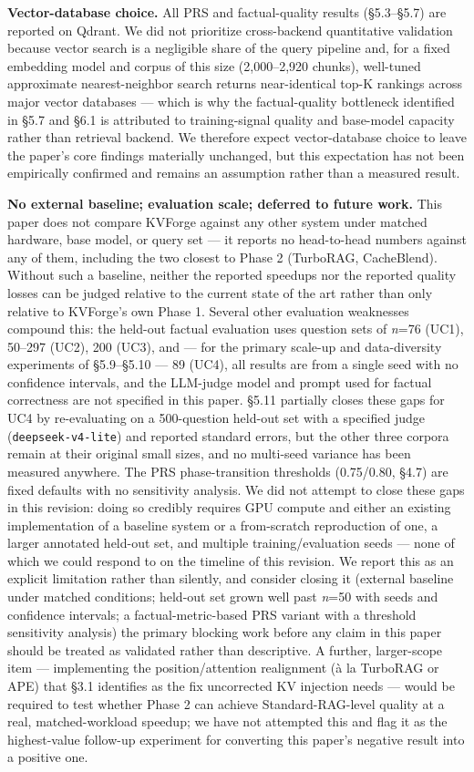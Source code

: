 \documentclass[10pt,twocolumn]{article}
\begin{document}
\textbf{Vector-database choice.} All PRS and factual-quality results (\S{}5.3--\S{}5.7) are reported on Qdrant. We did not prioritize cross-backend quantitative validation because vector search is a negligible share of the query pipeline and, for a fixed embedding model and corpus of this size (2,000--2,920 chunks), well-tuned approximate nearest-neighbor search returns near-identical top-K rankings across major vector databases --- which is why the factual-quality bottleneck identified in \S{}5.7 and \S{}6.1 is attributed to training-signal quality and base-model capacity rather than retrieval backend. We therefore expect vector-database choice to leave the paper's core findings materially unchanged, but this expectation has not been empirically confirmed and remains an assumption rather than a measured result.


\textbf{No external baseline; evaluation scale; deferred to future work.} This paper does not compare KVForge against any other system under matched hardware, base model, or query set --- it reports no head-to-head numbers against any of them, including the two closest to Phase 2 (TurboRAG, CacheBlend). Without such a baseline, neither the reported speedups nor the reported quality losses can be judged relative to the current state of the art rather than only relative to KVForge's own Phase 1. Several other evaluation weaknesses compound this: the held-out factual evaluation uses question sets of \textit{n}=76 (UC1), 50--297 (UC2), 200 (UC3), and --- for the primary scale-up and data-diversity experiments of \S{}5.9--\S{}5.10 --- 89 (UC4), all results are from a single seed with no confidence intervals, and the LLM-judge model and prompt used for factual correctness are not specified in this paper. \S{}5.11 partially closes these gaps for UC4 by re-evaluating on a 500-question held-out set with a specified judge (\texttt{deepseek-v4-lite}) and reported standard errors, but the other three corpora remain at their original small sizes, and no multi-seed variance has been measured anywhere. The PRS phase-transition thresholds (0.75/0.80, \S{}4.7) are fixed defaults with no sensitivity analysis. We did not attempt to close these gaps in this revision: doing so credibly requires GPU compute and either an existing implementation of a baseline system or a from-scratch reproduction of one, a larger annotated held-out set, and multiple training/evaluation seeds --- none of which we could respond to on the timeline of this revision. We report this as an explicit limitation rather than silently, and consider closing it (external baseline under matched conditions; held-out set grown well past \textit{n}=50 with seeds and confidence intervals; a factual-metric-based PRS variant with a threshold sensitivity analysis) the primary blocking work before any claim in this paper should be treated as validated rather than descriptive. A further, larger-scope item --- implementing the position/attention realignment (\`{a} la TurboRAG or APE) that \S{}3.1 identifies as the fix uncorrected KV injection needs --- would be required to test whether Phase 2 can achieve Standard-RAG-level quality at a real, matched-workload speedup; we have not attempted this and flag it as the highest-value follow-up experiment for converting this paper's negative result into a positive one.
\end{document}
